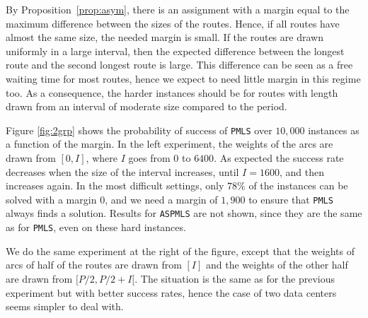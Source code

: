 \documentclass[a4paper,10pt]{journal}
\newcommand\PMLS{\texttt{PMLS}\xspace}
\newcommand\ASPMLS{\texttt{ASPMLS}\xspace}
\begin{document}
		  By Proposition~\ref{prop:asym}, there is an assignment with a margin equal to the maximum difference
    between the sizes of the routes. Hence, if all routes have almost the same size, the needed margin is small. If the routes are drawn uniformly in a large interval, then the expected difference between the longest route and the second longest route is large. This difference can be seen as a free waiting time for most routes, hence we expect to need little margin in this regime too. As a consequence, the harder instances should be for routes with length drawn from an interval of moderate size compared to the period.

  	Figure \ref{fig:2grp} shows the probability of success of \PMLS  over $10,000$ instances as a function of the margin. In the left experiment, the weights of the arcs are drawn from $[0,I]$, where $I$ goes from $0$ to $6400$. As expected the success rate decreases when the size of the interval increases, until $I = 1600$, and then increases again.  In the most difficult settings, only $78\%$ of the instances can be solved with a margin $0$, and we need a margin of $1,900$ to ensure that \PMLS always finds a solution. Results for \ASPMLS are not shown, since they are the same as for \PMLS, even on these hard instances.

 	 We do the same experiment at the right of the figure, except that the weights of arcs of half of the routes are drawn from $[I]$ and the weights of the other half are drawn from $[P/2,P/2 + I[$. The situation is the same as for the previous experiment but with better success rates, hence the case of two data centers seems simpler to deal with.
  
\end{document}
